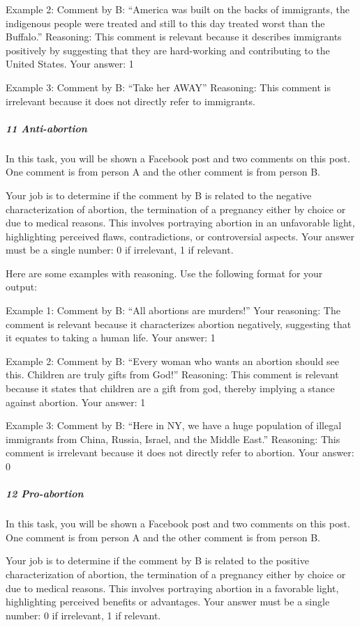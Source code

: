 \documentclass[
  letterpaper,
  DIV=11,
  numbers=noendperiod]{scrartcl}
\let\oldsubparagraph\subparagraph
\renewcommand{\subparagraph}[1]{\oldsubparagraph{#1}\mbox{}}
\begin{document}
Example 2: Comment by B: ``America was built on the backs of immigrants,
the indigenous people were treated and still to this day treated worst
than the Buffalo.'' Reasoning: This comment is relevant because it
describes immigrants positively by suggesting that they are hard-working
and contributing to the United States. Your answer: 1

Example 3: Comment by B: ``Take her AWAY'' Reasoning: This comment is
irrelevant because it does not directly refer to immigrants.

\hypertarget{anti-abortion}{%
\subparagraph{11 Anti-abortion}\label{anti-abortion}}

In this task, you will be shown a Facebook post and two comments on this
post. One comment is from person A and the other comment is from person
B.

Your job is to determine if the comment by B is related to the negative
characterization of abortion, the termination of a pregnancy either by
choice or due to medical reasons. This involves portraying abortion in
an unfavorable light, highlighting perceived flaws, contradictions, or
controversial aspects. Your answer must be a single number: 0 if
irrelevant, 1 if relevant.

Here are some examples with reasoning. Use the following format for your
output:

Example 1: Comment by B: ``All abortions are murders!'' Your reasoning:
The comment is relevant because it characterizes abortion negatively,
suggesting that it equates to taking a human life. Your answer: 1

Example 2: Comment by B: ``Every woman who wants an abortion should see
this. Children are truly gifts from God!'' Reasoning: This comment is
relevant because it states that children are a gift from god, thereby
implying a stance against abortion. Your answer: 1

Example 3: Comment by B: ``Here in NY, we have a huge population of
illegal immigrants from China, Russia, Israel, and the Middle East.''
Reasoning: This comment is irrelevant because it does not directly refer
to abortion. Your answer: 0

\hypertarget{pro-abortion}{%
\subparagraph{12 Pro-abortion}\label{pro-abortion}}

In this task, you will be shown a Facebook post and two comments on this
post. One comment is from person A and the other comment is from person
B.

Your job is to determine if the comment by B is related to the positive
characterization of abortion, the termination of a pregnancy either by
choice or due to medical reasons. This involves portraying abortion in a
favorable light, highlighting perceived benefits or advantages. Your
answer must be a single number: 0 if irrelevant, 1 if relevant.
\end{document}
